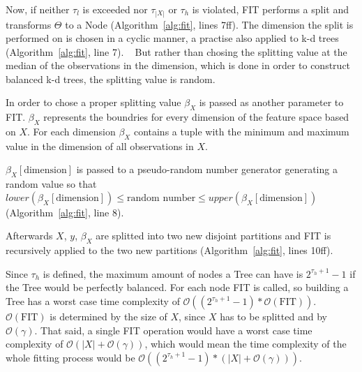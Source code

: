 Now, if neither $\tau_l$ is exceeded nor $\tau_{|X|}$ or
$\tau_h$ is violated, FIT performs a split and transforms
$\Theta$ to a Node (Algorithm~\ref{alg:fit}, lines 7ff).
The dimension the split is performed on is chosen in a
cyclic manner, a practise also applied to k-d trees
(Algorithm~\ref{alg:fit}, line 7).%
~\cite{Brown2015kdtree}
But rather than chosing the splitting value at the median
of the observations in the dimension, which is done in
order to construct balanced k-d trees, the splitting value
is random.\cite{Brown2015kdtree}

In order to chose a proper splitting value $\beta_X$ is
passed as another parameter to FIT. $\beta_X$ represents
the boundries for every dimension of the feature space
based on $X$. For each dimension $\beta_X$ contains a
tuple with the minimum and maximum value in the dimension
of all observations in $X$.

$\beta_X[\text{dimension}]$ is passed to a pseudo-random
number generator generating a random value so that
$lower(\beta_X[\text{dimension}]) \leq \text{random number}
\leq upper(\beta_X[\text{dimension}])$
(Algorithm~\ref{alg:fit}, line 8).

Afterwards $X$, $y$, $\beta_X$ are splitted into two new
disjoint partitions and FIT is recursively applied to the
two new partitions (Algorithm~\ref{alg:fit}, lines 10ff).

Since $\tau_h$ is defined, the maximum amount of nodes a
Tree can have is $2^{\tau_h + 1} - 1$ if the Tree would be
perfectly balanced. \cite[chapter 16.1]{Teschl} For each
node FIT is called, so building a Tree has a worst case
time complexity of $\mathcal{O}((2^{\tau_h + 1} -1)*
\mathcal{O}(\text{FIT}))$. $\mathcal{O}(\text{FIT})$ is
determined by the size of $X$, since $X$ has to be splitted
and by $\mathcal{O}(\gamma)$. That said, a single FIT
operation would have a worst case time complexity of
$\mathcal{O}(|X| + \mathcal{O}(\gamma))$, which would mean
the time complexity of the whole fitting process would be
$\mathcal{O}((2^{\tau_h + 1} - 1) * (|X| + \mathcal{O}
(\gamma)))$.

